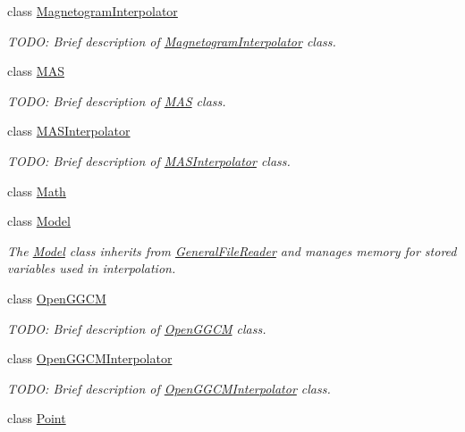 \begin{DoxyCompactItemize}
class \hyperlink{classccmc_1_1_magnetogram_interpolator}{Magnetogram\-Interpolator}
\begin{DoxyCompactList}\small\item\em T\-O\-D\-O\-: Brief description of \hyperlink{classccmc_1_1_magnetogram_interpolator}{Magnetogram\-Interpolator} class. \end{DoxyCompactList}\item 
class \hyperlink{classccmc_1_1_m_a_s}{M\-A\-S}
\begin{DoxyCompactList}\small\item\em T\-O\-D\-O\-: Brief description of \hyperlink{classccmc_1_1_m_a_s}{M\-A\-S} class. \end{DoxyCompactList}\item 
class \hyperlink{classccmc_1_1_m_a_s_interpolator}{M\-A\-S\-Interpolator}
\begin{DoxyCompactList}\small\item\em T\-O\-D\-O\-: Brief description of \hyperlink{classccmc_1_1_m_a_s_interpolator}{M\-A\-S\-Interpolator} class. \end{DoxyCompactList}\item 
class \hyperlink{classccmc_1_1_math}{Math}
\item 
class \hyperlink{classccmc_1_1_model}{Model}
\begin{DoxyCompactList}\small\item\em The \hyperlink{classccmc_1_1_model}{Model} class inherits from \hyperlink{classccmc_1_1_general_file_reader}{General\-File\-Reader} and manages memory for stored variables used in interpolation. \end{DoxyCompactList}\item 
class \hyperlink{classccmc_1_1_open_g_g_c_m}{Open\-G\-G\-C\-M}
\begin{DoxyCompactList}\small\item\em T\-O\-D\-O\-: Brief description of \hyperlink{classccmc_1_1_open_g_g_c_m}{Open\-G\-G\-C\-M} class. \end{DoxyCompactList}\item 
class \hyperlink{classccmc_1_1_open_g_g_c_m_interpolator}{Open\-G\-G\-C\-M\-Interpolator}
\begin{DoxyCompactList}\small\item\em T\-O\-D\-O\-: Brief description of \hyperlink{classccmc_1_1_open_g_g_c_m_interpolator}{Open\-G\-G\-C\-M\-Interpolator} class. \end{DoxyCompactList}\item 
class \hyperlink{classccmc_1_1_point}{Point}

\end{DoxyCompactItemize}
